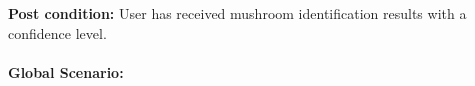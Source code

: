 \documentclass{article}
\begin{document}
\begin{enumerate}[{\bf BE1.}]
		\vspace{0.2cm}
		\textbf{Post condition: } User has received mushroom identification results with a confidence level.\\
		\vspace{0.1cm}\\
		{\bf Global Scenario:}\\
		\begin{enumerate}[1.]

\end{enumerate}
\end{enumerate}
\end{document}
